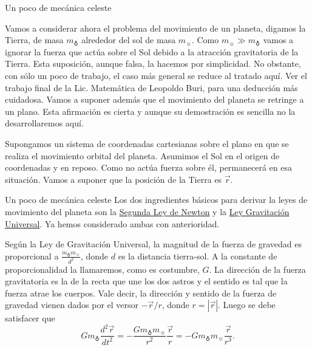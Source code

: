 \documentclass[handout,hyperref={colorlinks=true}]{beamer}
\renewcommand{\v}[1]{\overrightarrow{#1}}
\begin{document}
 
 \begin{frame}{Un poco de mecánica celeste}
 
 Vamos a considerar ahora el problema del movimiento de un planeta, digamos la Tierra, de masa $m_{\earth}$ alrededor del sol de masa $m_{\sun}$. Como 
 $m_{\sun}\gg m_{\earth}$ vamos a ignorar la fuerza que actúa sobre el Sol debido a la atracción gravitatoria de la Tierra. Esta suposición, aunque falsa, la hacemos 
 por simplicidad. No obstante, con sólo un poco de trabajo, el caso más general se reduce al tratado aquí. Ver el trabajo final de la Lic. Matemática de Leopoldo Buri,
 para una deducción más cuidadosa. Vamos a suponer además que el movimiento del planeta se retringe a un plano. Esta afirmación es cierta y aunque su demostración
 es sencilla no la desarrollaremos aquí. 
 
 Supongamos un sistema de coordenadas cartesianas sobre el plano en que se realiza el movimiento orbital del planeta. Asumimos el Sol en el origen de coordenadas y en 
 reposo. Como no actúa fuerza sobre él, permanecerá en esa situación. Vamos a suponer que la posición de la Tierra es $\v{r}$.

  
 
  
  \end{frame}

  

\begin{frame}{Un poco de mecánica celeste}
   Los dos ingredientes básicos para derivar la leyes de movimiento del planeta son la 
   \href{http://es.wikipedia.org/wiki/Leyes_de_Newton\#Segunda_ley_de_Newton_o_ley_de_fuerza}{Segunda Ley de Newton} y la
   \href{http://es.wikipedia.org/wiki/Ley_de_gravitación_universal}{Ley Gravitación Universal}. Ya  hemos considerado ambas con anterioridad. 
   
  Según  la Ley de Gravitación Universal, la magnitud de la fuerza de gravedad es proporcional a $\frac{m_{\earth}m_{\sun}}{d^2}$, donde $d$ es la distancia tierra-sol. 
  A la constante de proporcionalidad la llamaremos, como es costumbre, $G$. La dirección de la fuerza gravitatoria es la de la recta que une los  dos astros y 
  el sentido es tal que la fuerza atrae los cuerpos. Vale decir, la dirección y sentido de la 
  fuerza de gravedad vienen dados por el versor $-\v{r}/r$, donde $r=|\v{r}|$. Luego se debe satisfacer que
  \[Gm_{\earth}\frac{d^2\v{r}}{dt^2}=-\frac{Gm_{\earth}m_{\sun}}{r^2}\frac{\v{r}}{r}=-Gm_{\earth}m_{\sun}\frac{\v{r}}{r^3}. \]
   
   
\end{frame}
\end{document}
